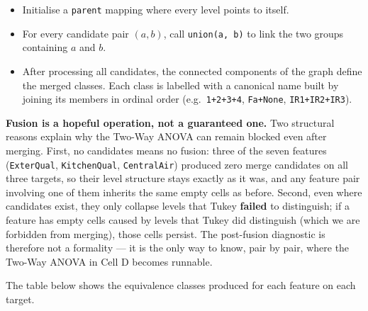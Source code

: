 \begin{itemize}
\tightlist
\item
  Initialise a \texttt{parent} mapping where every level points to
  itself.
\item
  For every candidate pair \((a, b)\), call \texttt{union(a,\ b)} to
  link the two groups containing \(a\) and \(b\).
\item
  After processing all candidates, the connected components of the graph
  define the merged classes. Each class is labelled with a canonical
  name built by joining its members in ordinal order
  (e.g.~\texttt{1+2+3+4}, \texttt{Fa+None}, \texttt{IR1+IR2+IR3}).
\end{itemize}

\textbf{Fusion is a hopeful operation, not a guaranteed one.} Two
structural reasons explain why the Two-Way ANOVA can remain blocked even
after merging. First, no candidates means no fusion: three of the seven
features (\texttt{ExterQual}, \texttt{KitchenQual}, \texttt{CentralAir})
produced zero merge candidates on all three targets, so their level
structure stays exactly as it was, and any feature pair involving one of
them inherits the same empty cells as before. Second, even where
candidates exist, they only collapse levels that Tukey \textbf{failed}
to distinguish; if a feature has empty cells caused by levels that Tukey
did distinguish (which we are forbidden from merging), those cells
persist. The post-fusion diagnostic is therefore not a formality --- it
is the only way to know, pair by pair, where the Two-Way ANOVA in Cell D
becomes runnable.

The table below shows the equivalence classes produced for each feature
on each target.

